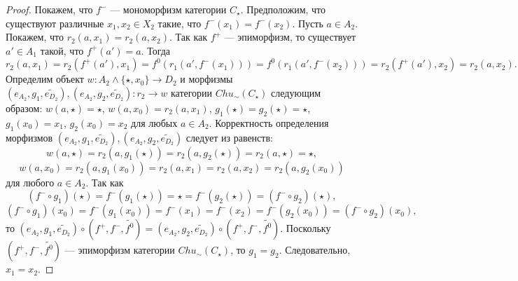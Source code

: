 \documentclass[a4paper,12pt]{article}
\newcommand{\fo}{\widetilde{f^0}}
\begin{document}
\begin{proof}
    Покажем, что $f^-$ --- мономорфизм категории $C_\star$. Предположим, что существуют различные $x_1, x_2 \in X_2$ такие, что $f^-(x_1) = f^-(x_2)$. Пусть $a \in A_2$. Покажем, что $r_2(a,x_1) = r_2(a,x_2)$. Так как $f^+$ --- эпиморфизм, то существует $a' \in A_1$ такой, что $f^+(a') = a$. Тогда
    $$
        r_2(a,x_1) = r_2(f^+(a'),x_1) = f^0(r_1(a',f^-(x_1))) = f^0(r_1(a',f^-(x_2))) = r_2(f^+(a'),x_2) = r_2(a,x_2).
    $$
    Определим объект $w: A_2 \wedge \{\star,x_0\} \to D_2$ и морфизмы $(e_{A_2},g_1,\widetilde{e_{D_2}}), (e_{A_2},g_2,\widetilde{e_{D_2}}): r_2 \to w$ категории $Chu_\sim(C_\star)$ следующим образом: $w(a,\star) = \star$, $w(a,x_0) = r_2(a,x_1)$, $g_1(\star) = g_2(\star) = \star$, $g_1(x_0) = x_1$, $g_2(x_0) = x_2$ для любых $a \in A_2$. Корректность определения морфизмов $(e_{A_2},g_1,\widetilde{e_{D_2}}), (e_{A_2},g_2,\widetilde{e_{D_2}})$ следует из равенств:
    $$
        w(a,\star) = r_2(a,g_1(\star)) = r_2(a,g_2(\star)) = r_2(a,\star) = \star,
    $$
    $$
        w(a,x_0) = r_2(a,g_1(x_0)) = r_2(a,x_1) = r_2(a,x_2) = r_2(a,g_2(x_0))
    $$
    для любого $a \in A_2$. Так как
    $$
        (f^- \circ g_1)(\star) = f^-(g_1(\star)) = \star = f^-(g_2(\star)) = (f^- \circ g_2)(\star),
    $$
    $$
        (f^- \circ g_1)(x_0) = f^-(g_1(x_0)) = f^-(x_1) = f^-(x_2) = f^-(g_2(x_0)) = (f^- \circ g_2)(x_0),
    $$
    то $(e_{A_2},g_1,\widetilde{e_{D_2}}) \circ (f^+,f^-,\fo) = (e_{A_2},g_2,\widetilde{e_{D_2}}) \circ (f^+,f^-,\fo)$. Поскольку $(f^+,f^-,\fo)$ --- эпиморфизм категории $Chu_\sim(C_\star)$, то $g_1 = g_2$. Следовательно, $x_1 = x_2$.


\end{proof}
\end{document}

